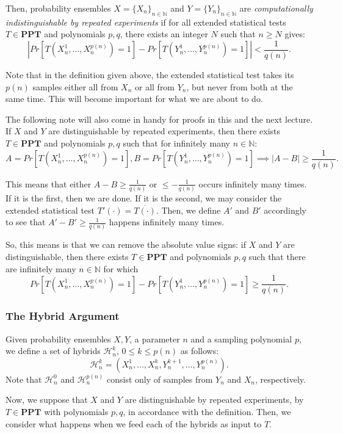 \documentclass[11pt]{article}
\newcommand{\PPT}{\mathbf{PPT}}
\newcommand{\N}{\mathbb{N}}
\newcommand{\mcH}{\mathcal{H}}
\begin{document}
Then, probability ensembles \(X=\{X_n\}_{n\in\N}\) and \(Y=\{Y_n\}_{n\in\N}\) are \emph{computationally indistinguishable by repeated experiments} if for all extended statistical tests \(T\in\PPT\) and polynomials \(p,q\), there exists an integer \(N\) such that \(n\ge N\) gives:
\[| Pr[T(X_n^1,\ldots,X_n^{p(n)})=1]-Pr[T(Y_n^1,\ldots,Y_n^{p(n)})=1] | <\frac{1}{q(n)}.\]

Note that in the definition given above, the extended statistical test takes its \(p(n)\) samples either all from \(X_n\) or all from \(Y_n\), but never from both at the same time. This will become important for what we are about to do.

The following note will also come in handy for proofs in this and the next lecture.\\ If \(X\) and \(Y\) are distinguishable by repeated experiments, then there exists \(T\in\PPT\) and polynomials \(p,q\) such that for infinitely many \(n\in\N\):
\[A = Pr[T(X_n^1,\ldots,X_n^{p(n)})=1], B = Pr[T(Y_n^1,\ldots,Y_n^{p(n)})=1] \implies |A-B| \ge\frac{1}{q(n)}.\]

This means that either \(A-B\ge\frac{1}{q(n)}\) or \(\le-\frac{1}{q(n)}\) occurs infinitely many times. If it is the first, then we are done. If it is the second, we may consider the extended statistical test \(T'(\cdot)=\overline{T(\cdot)}\). Then, we define \(A'\) and \(B'\) accordingly to see that \(A'-B'\ge\frac{1}{q(n)}\) happens infinitely many times. \smallskip

So, this means is that we can remove the absolute value signs: if \(X\) and \(Y\) are distinguishable, then there exists \(T\in\PPT\) and polynomials \(p,q\) such that there are infinitely many \(n\in\N\) for which
\[Pr[T(X_n^1,\ldots,X_n^{p(n)})=1]-Pr[T(Y_n^1,\ldots,Y_n^{p(n)})=1] \ge\frac{1}{q(n)}.\]

\subsubsection{The Hybrid Argument}
Given probability ensembles \(X,Y\), a parameter \(n\) and a sampling polynomial \(p\), we define a set of hybrids \(\mcH_n^k\), \(0\le k\le p(n)\) as follows:
\[\mcH_n^k = \left(X_n^1,\ldots,X_n^k,Y_n^{k+1},\ldots,Y_n^{p(n)}\right).\]
Note that \(\mcH_n^0\) and \(\mcH_n^{p(n)}\) consist only of samples from \(Y_n\) and \(X_n\), respectively.\medskip

Now, we suppose that \(X\) and \(Y\) are distinguishable by repeated experiments, by \(T\in\PPT\) with polynomials \(p,q\), in accordance with the definition. Then, we consider what happens when we feed each of the hybrids as input to \(T\).
\end{document}
